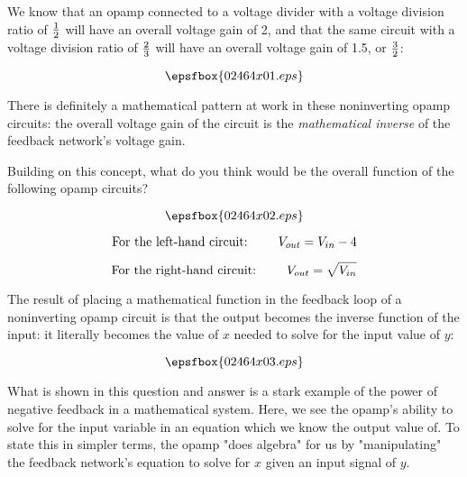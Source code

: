 

We know that an opamp connected to a voltage divider with a voltage division ratio of $1 \over 2$ will have an overall voltage gain of 2, and that the same circuit with a voltage division ratio of $2 \over 3$ will have an overall voltage gain of 1.5, or $3 \over 2$: 

$$\epsfbox{02464x01.eps}$$

There is definitely a mathematical pattern at work in these noninverting opamp circuits: the overall voltage gain of the circuit is the {\it mathematical inverse} of the feedback network's voltage gain.

Building on this concept, what do you think would be the overall function of the following opamp circuits?

$$\epsfbox{02464x02.eps}$$







$$\hbox{For the left-hand circuit: \hskip 20pt} V_{out} = V_{in} - 4$$

$$\hbox{For the right-hand circuit: \hskip 20pt} V_{out} = \sqrt{V_{in}}$$

\vskip 5pt

The result of placing a mathematical function in the feedback loop of a noninverting opamp circuit is that the output becomes the inverse function of the input: it literally becomes the value of $x$ needed to solve for the input value of $y$:

$$\epsfbox{02464x03.eps}$$







What is shown in this question and answer is a stark example of the power of negative feedback in a mathematical system.  Here, we see the opamp's ability to solve for the input variable in an equation which we know the output value of.  To state this in simpler terms, the opamp "does algebra" for us by "manipulating" the feedback network's equation to solve for $x$ given an input signal of $y$.




